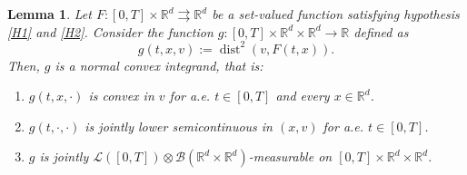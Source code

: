 \documentclass[11pt]{elsarticle}
\newtheorem{lemma}[theorem]{Lemma}
\theoremstyle{definition}
\theoremstyle{remark}
\numberwithin{equation}{section}
\begin{document}
	\begin{lemma}\label{lem:normal-integrand}
		Let $F:[0,T]\times\mathbb{R}^d\rightrightarrows\mathbb{R}^d$ be a set-valued function satisfying hypothesis {\rm\ref{H1}} and {\rm\ref{H2}}.
		Consider the function $g:[0,T]\times \mathbb{R}^d \times \mathbb{R}^d \to \mathbb{R}$ defined as
		\[
		g(t, x, v) := \operatorname{dist}^2(v, F(t, x)).
		\]
		Then, $g$ is a normal convex integrand, that is:
		\begin{enumerate}
			\item $g(t, x, \cdot)$ is convex in $v$ for a.e. $t \in [0,T]$ and every $x\in\mathbb{R}^d$.
			\item $g(t, \cdot, \cdot)$ is jointly lower semicontinuous in $(x, v)$ for a.e. $t \in [0,T]$.
			\item $g$ is jointly
			$\mathscr{L}([0,T])\otimes\mathcal{B}(\mathbb{R}^d\times\mathbb{R}^d)$-measurable
			on $[0,T]\times\mathbb{R}^d\times\mathbb{R}^d$.
		\end{enumerate}
	\end{lemma}
\end{document}
